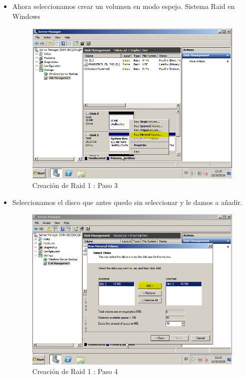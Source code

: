 \begin{itemize}
		\item Ahora seleccionamos crear un volumen en modo espejo. Sistema Raid en Windows 
		\begin{figure}[H] %
			\centering
			\includegraphics[scale=0.5]{pics/Captura3.png}  %
			\caption{Creación de Raid 1 : Paso 3} \label{fig:figura3}
		\end{figure}
	
		\item Seleccionamos el disco que antes quedo sin seleccionar y le damos a añadir.
		\begin{figure}[H] %
			\centering
			\includegraphics[scale=0.5]{pics/Captura4.png}  %
			\caption{Creación de Raid 1 : Paso 4} \label{fig:figura4}
		\end{figure}
	

\end{itemize}
